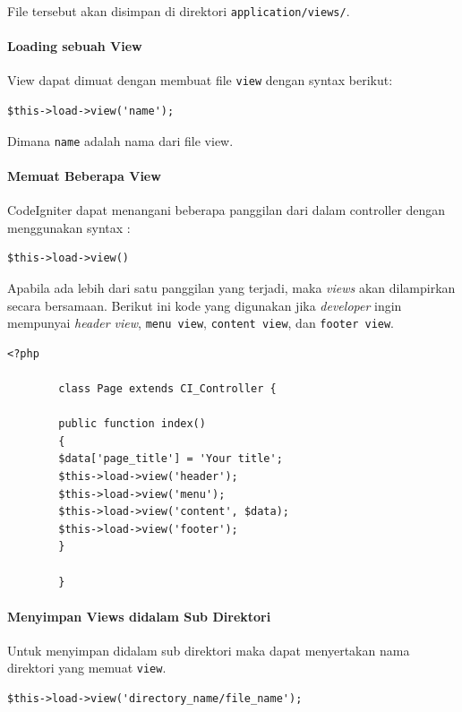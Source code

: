 \documentclass[a4paper,twoside]{article}
\begin{document}
\begin{enumerate}
		File tersebut akan disimpan di direktori \texttt{application/views/}.
		
		\paragraph{Loading sebuah View} \par
		
		
		View dapat dimuat dengan membuat file \texttt{view} dengan syntax berikut:
		
		\begin{lstlisting}[frame=single] 
		$this->load->view('name');
		\end{lstlisting}
		
		\noindent Dimana \texttt{name} adalah nama dari file view.
		
		\paragraph{Memuat Beberapa View} \par
		
		CodeIgniter dapat menangani beberapa panggilan dari dalam controller dengan menggunakan syntax : 
		
		\begin{lstlisting}[frame=single] 
		$this->load->view()
		\end{lstlisting}
		
		Apabila ada lebih dari satu panggilan yang terjadi, maka \textit{views} akan dilampirkan secara bersamaan. Berikut ini kode yang digunakan jika \textit{developer} ingin mempunyai \textit{header view}, \texttt{menu view}, \texttt{content view}, dan \texttt{footer view}. 
		
		
		\begin{lstlisting}[frame=single] 
		<?php
		
		class Page extends CI_Controller {
		
		public function index()
		{
		$data['page_title'] = 'Your title';
		$this->load->view('header');
		$this->load->view('menu');
		$this->load->view('content', $data);
		$this->load->view('footer');
		}
		
		}
		\end{lstlisting}
		
		\paragraph{Menyimpan Views didalam Sub Direktori}
		
		Untuk menyimpan didalam sub direktori maka dapat menyertakan nama direktori yang memuat \texttt{view}.
		\begin{lstlisting}[frame=single] 
		$this->load->view('directory_name/file_name');
		\end{lstlisting}
		

\end{enumerate}
\end{document}
